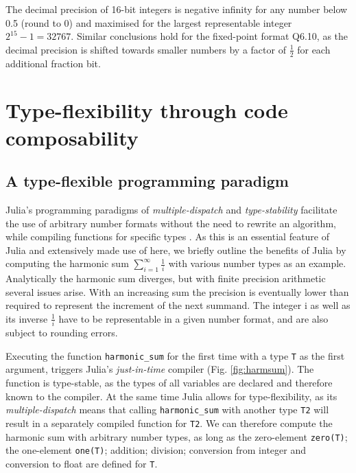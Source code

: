 The decimal precision of 16-bit integers is negative infinity for any number below 0.5 (round to 0) and maximised for the
largest representable integer $2^{15} - 1 =  32767$. Similar conclusions hold for the fixed-point format Q6.10, as the decimal
precision is shifted towards smaller numbers by a factor of $\tfrac{1}{2}$ for each additional fraction bit.

	\section{Type-flexibility through code composability}
	\subsection{A type-flexible programming paradigm}

Julia's programming paradigms of \emph{multiple-dispatch} and \emph{type-stability} facilitate the use of arbitrary number formats
without the need to rewrite an algorithm, while compiling functions for specific types \citep{Bezanson2017}. As this is an essential
feature of Julia and extensively made use of here, we briefly outline the benefits of Julia by computing the harmonic sum
$\sum_{i=1}^\infty \tfrac{1}{i}$ with various number types as an example. Analytically the harmonic sum diverges, but with
finite precision arithmetic several issues arise. With an increasing sum the precision is eventually lower than required to
represent the increment of the next summand. The integer i as well as its inverse $\tfrac{1}{i}$ have to be representable
in a given number format, and are also subject to rounding errors.

%
%
%
%

Executing the function \texttt{harmonic\_sum} for the first time with a type \texttt{T} as the first argument, triggers Julia's
\emph{just-in-time} compiler (Fig. \ref{fig:harmsum}). The function is type-stable, as the types of all variables are declared
and therefore known to the compiler. At the same time Julia allows for type-flexibility, as its \emph{multiple-dispatch} means
that calling \texttt{harmonic\_sum} with another type \texttt{T2} will result in a separately compiled function for \texttt{T2}.
We can therefore compute the harmonic sum with arbitrary number types, as long as the zero-element \texttt{zero(T)};
the one-element \texttt{one(T)}; addition; division; conversion from integer and conversion to float are defined for \texttt{T}.

